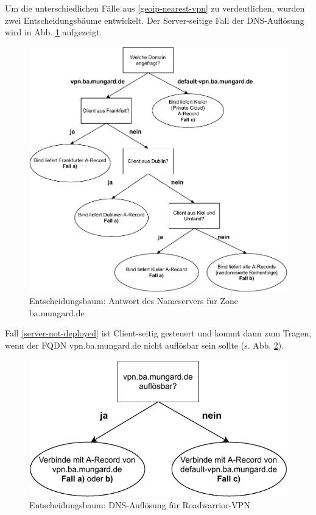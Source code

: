 Um die unterschiedlichen Fälle aus \ref{geoip-nearest-vpn} zu verdeutlichen, wurden zwei Entscheidungsbäume entwickelt. Der Server-seitige Fall der \gls{DNS}-Auflösung wird in Abb. \ref{grafik:Use-Case_2_Entscheidungsbaum_GeoIP} aufgezeigt.
\begin{figure}[h]
  \centering
  \includegraphics{Figures/entscheidungsbaum_bind_geoip.pdf}
  \caption{Entscheidungsbaum: Antwort des Nameservers für Zone ba.mungard.de}
  \label{grafik:Use-Case_2_Entscheidungsbaum_GeoIP}
\end{figure}\FloatBarrier

Fall \ref{server-not-deployed} ist \gls{Client}-seitig gesteuert und kommt dann zum Tragen, wenn der \gls{FQDN} vpn.ba.mungard.de nicht auflösbar sein sollte (s. Abb. \ref{grafik:Use-Case_2_Entscheidungsbaum_OpenVPN}).

\begin{figure}[h]
  \centering
  \includegraphics{Figures/entscheidungsbaum_openvpn_config.pdf}
  \caption{Entscheidungsbaum: DNS-Auflösung für Roadwarrior-VPN}
  \label{grafik:Use-Case_2_Entscheidungsbaum_OpenVPN}
\end{figure}\FloatBarrier

